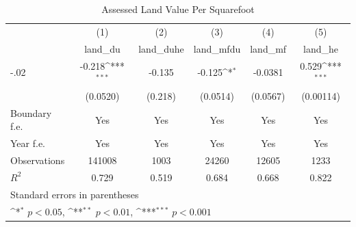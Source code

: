 \begin{table}[htbp]\centering
\def\sym#1{\ifmmode^{#1}\else\(^{#1}\)\fi}
\caption{Assessed Land Value Per Squarefoot}
\begin{tabular}{l*{5}{c}}
\hline\hline
                    &\multicolumn{1}{c}{(1)}&\multicolumn{1}{c}{(2)}&\multicolumn{1}{c}{(3)}&\multicolumn{1}{c}{(4)}&\multicolumn{1}{c}{(5)}\\
                    &\multicolumn{1}{c}{land\_du}&\multicolumn{1}{c}{land\_duhe}&\multicolumn{1}{c}{land\_mfdu}&\multicolumn{1}{c}{land\_mf}&\multicolumn{1}{c}{land\_he}\\
\hline
-.02                &      -0.218\sym{***}&      -0.135         &      -0.125\sym{*}  &     -0.0381         &       0.529\sym{***}\\
                    &    (0.0520)         &     (0.218)         &    (0.0514)         &    (0.0567)         &   (0.00114)         \\
[1em]
Boundary f.e.       &         Yes         &         Yes         &         Yes         &         Yes         &         Yes         \\
[1em]
Year f.e.           &         Yes         &         Yes         &         Yes         &         Yes         &         Yes         \\
\hline
Observations        &      141008         &        1003         &       24260         &       12605         &        1233         \\
\(R^{2}\)           &       0.729         &       0.519         &       0.684         &       0.668         &       0.822         \\
\hline\hline
\multicolumn{6}{l}{\footnotesize Standard errors in parentheses}\\
\multicolumn{6}{l}{\footnotesize \sym{*} \(p<0.05\), \sym{**} \(p<0.01\), \sym{***} \(p<0.001\)}\\
\end{tabular}
\end{table}
